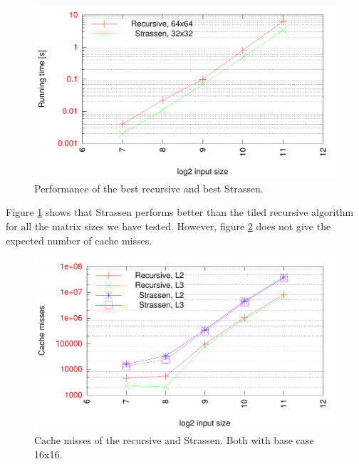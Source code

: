 \begin{figure}[h!]
  \centering
  \includegraphics[width=\textwidth]{"../project2/gnuplots/recursive_vs_strassen_performance"}
  \caption{Performance of the best recursive and best Strassen.}
  \label{fig:recursive_vs_strassen_performance}
\end{figure}

Figure \ref{fig:recursive_vs_strassen_performance} shows that Strassen performs better than the tiled recursive algorithm for all the matrix sizes we have tested. However, figure \ref{fig:recursive_vs_strassen_cache} does not give the expected number of cache misses. 

\begin{figure}[h!]
  \centering
  \includegraphics[width=\textwidth]{"../project2/gnuplots/recursive_vs_strassen_cache"}
  \caption{Cache misses of the recursive and Strassen. Both with base case 16x16.}
  \label{fig:recursive_vs_strassen_cache}
\end{figure}




